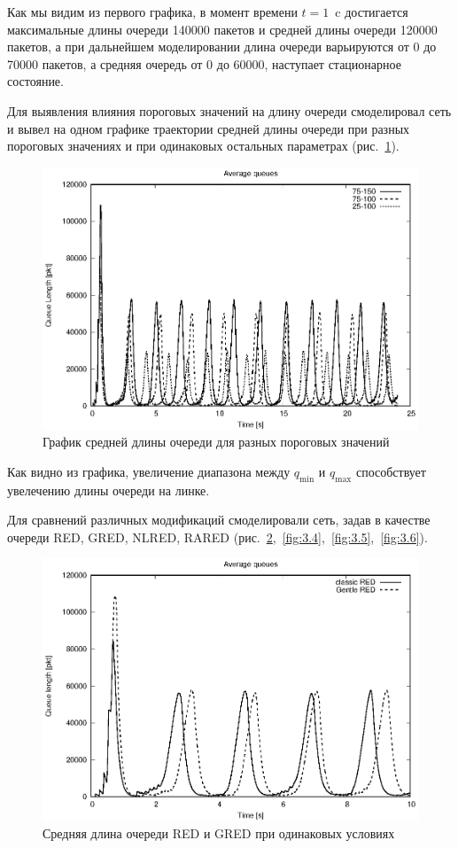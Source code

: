Как мы видим из первого графика, в момент времени $t=1$~c достигается
максимальные длины очереди 140000 пакетов и средней длины очереди
120000 пакетов, а при дальнейшем моделировании длина очереди
варьируются от 0 до 70000 пакетов, а средняя очередь от 0 до 60000,
наступает стационарное состояние.

Для выявления влияния пороговых значений на длину очереди смоделировал
сеть и вывел на одном графике траектории  средней длины очереди при разных
пороговых значениях и при одинаковых остальных параметрах
(рис.~\ref{fig:3.2}).

\begin{figure}[!ht]
  \centering
  \includegraphics[width=0.6\linewidth]{image/av_queues_maxthresh.eps}
  \caption{График средней длины очереди для разных пороговых значений}
  \label{fig:3.2}
\end{figure}

Как видно из графика, %
увеличение диапазона между $q_{\min}$ и $q_{\max}$ способствует
увелечению длины очереди на линке.

Для сравнений различных модификаций смоделировали сеть, задав в
качестве очереди RED, GRED, NLRED,
RARED (рис.~\ref{fig:3.3},~\ref{fig:3.4},~\ref{fig:3.5},~\ref{fig:3.6}).

\begin{figure}[!ht]
  \centering
  \includegraphics[width=0.6\linewidth]{image/av_queues_classic_gentle.eps}
  \caption{Средняя длина очереди RED и GRED при одинаковых условиях}
  \label{fig:3.3}
\end{figure}

